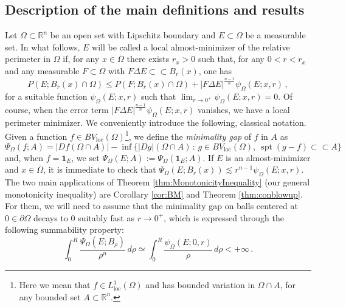 \documentclass[a4paper,reqno,11pt]{amsart}
\newcommand{\R}{\mathbb{R}}
\newcommand{\de}{\partial}
\newcommand{\spt}{\mathop{\mathrm{spt}}}
\newcommand{\loc}{\mathop{\mathrm{loc}}}
\newcommand{\difsim}{\Delta}
\newcommand{\ch}{\mathbf{1}}
\renewcommand{\Subset}{\subset\!\subset}
\newcommand{\p}{P}
\begin{document}
\subsection{Description of the main definitions and results}
Let $\Omega \subset \R^n$ be an open set with Lipschitz boundary and $E \subset \Omega$ be a measurable set. In what follows, $E$ will be called a local almost-minimizer of the relative perimeter in $\Omega$ if, for any $x\in \overline{\Omega}$ there exists $r_{x} > 0$ such that, for any $0 < r < r_{x}$ and any measurable $F\subset\Omega$ with $F \difsim E \subset \subset B_{r}(x)$, one has
\begin{equation*}
	\p(E;B_{r}(x) \cap \Omega) \leq \p(F;B_{r}(x) \cap \Omega) + |F \difsim E|^{\frac{n-1}{n}} \psi_{\Omega}(E;x,r) \, ,
\end{equation*}
for a suitable function $\psi_{\Omega}(E;x,r)$ such that $\lim_{r\to 0^{+}}\psi_{\Omega}(E;x,r) = 0$. Of course, when the error term $|F \difsim E|^{\frac{n-1}{n}} \psi_{\Omega}(E;x,r)$ vanishes, we have a local perimeter minimizer. We conveniently introduce the following, classical notation. Given a function $f \in BV_{\loc}(\Omega)$\footnote{Here we mean that $f \in L^{1}_{\loc}(\Omega)$ and has bounded variation in $\Omega \cap A$, for any bounded set $A \subset \R^n$.}, we define the \textit{minimality gap} of $f$ in $A$ as
\begin{equation*} %
\Psi_{\Omega}(f;A) = |Df(\Omega \cap A)| - \inf\big\{ |Dg|(\Omega \cap A) \, : \, g \in BV_{\loc}(\Omega),\ \spt(g-f)\Subset A \big\} 
\end{equation*}
and, when $f = \ch_E$, we set $\Psi_{\Omega}(E;A) := \Psi_{\Omega}(\ch_E;A)$. If $E$ is an almost-minimizer and $x \in \overline{\Omega}$, it is immediate to check that $\Psi_{\Omega}(E;B_r(x)) \lesssim r^{n-1} \psi_\Omega(E;x,r)$. The two main applications of Theorem \ref{thm:MonotonicityInequality} (our general monotonicity inequality) are Corollary \ref{cor:BM} and Theorem \ref{thm:conblowup}. For them, we will need to assume that the minimality gap on balls centered at $0 \in \de \Omega$ decays to $0$ suitably fast as $r \to 0^+$, which is expressed through the following summability property:
\begin{equation} \label{eq:decaymingap}
\int_{0}^{R}\dfrac{\Psi_{\Omega}(E;B_{\rho})}{\rho^n}\, d\rho \simeq  \int_{0}^{R}\dfrac{\psi_{\Omega}(E;0,r)}{\rho}\, d\rho <+\infty\, .
\end{equation}
\end{document}
